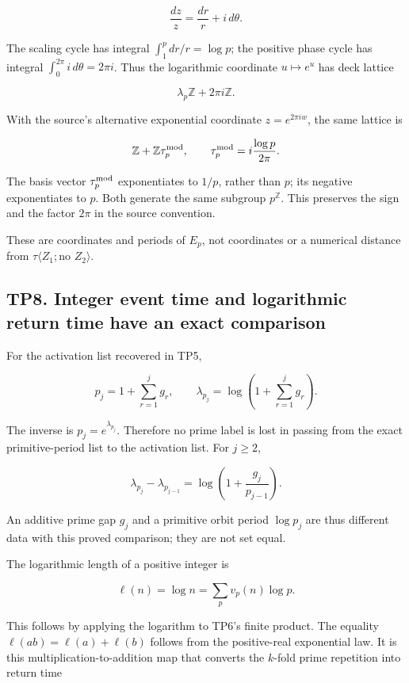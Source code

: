 \documentclass[
]{article}
\begin{document}
\[
\frac{dz}{z}=\frac{dr}{r}+i\,d\theta.
\]

The scaling cycle has integral \(\int_1^p dr/r=\log p\); the positive
phase cycle has integral \(\int_0^{2\pi}i\,d\theta=2\pi i\). Thus the
logarithmic coordinate \(u\mapsto e^u\) has deck lattice

\[
\lambda_p\mathbb Z+2\pi i\mathbb Z.
\]

With the source's alternative exponential coordinate \(z=e^{2\pi i w}\),
the same lattice is

\[
\mathbb Z+\mathbb Z\tau_p^{\rm mod},
\qquad \tau_p^{\rm mod}=i\frac{\log p}{2\pi}.
\]

The basis vector \(\tau_p^{\rm mod}\) exponentiates to \(1/p\), rather
than \(p\); its negative exponentiates to \(p\). Both generate the same
subgroup \(p^{\mathbb Z}\). This preserves the sign and the factor
\(2\pi\) in the source convention.

These are coordinates and periods of \(E_p\), not coordinates or a
numerical distance from \(\tau\langle Z_1;\text{no }Z_2\rangle\).

\subsection{TP8. Integer event time and logarithmic return time have an
exact
comparison}\label{tp8.-integer-event-time-and-logarithmic-return-time-have-an-exact-comparison}

For the activation list recovered in TP5,

\[
p_j=1+\sum_{r=1}^{j}g_r,
\qquad
\lambda_{p_j}=\log\!\left(1+\sum_{r=1}^{j}g_r\right).
\]

The inverse is \(p_j=e^{\lambda_{p_j}}\). Therefore no prime label is
lost in passing from the exact primitive-period list to the activation
list. For \(j\ge2\),

\[
\lambda_{p_j}-\lambda_{p_{j-1}}
=\log\!\left(1+\frac{g_j}{p_{j-1}}\right).
\]

An additive prime gap \(g_j\) and a primitive orbit period \(\log p_j\)
are thus different data with this proved comparison; they are not set
equal.

The logarithmic length of a positive integer is

\[
\ell(n)=\log n=\sum_p v_p(n)\log p.
\]

This follows by applying the logarithm to TP6's finite product. The
equality \(\ell(ab)=\ell(a)+\ell(b)\) follows from the positive-real
exponential law. It is this multiplication-to-addition map that converts
the \(k\)-fold prime repetition into return time
\end{document}
